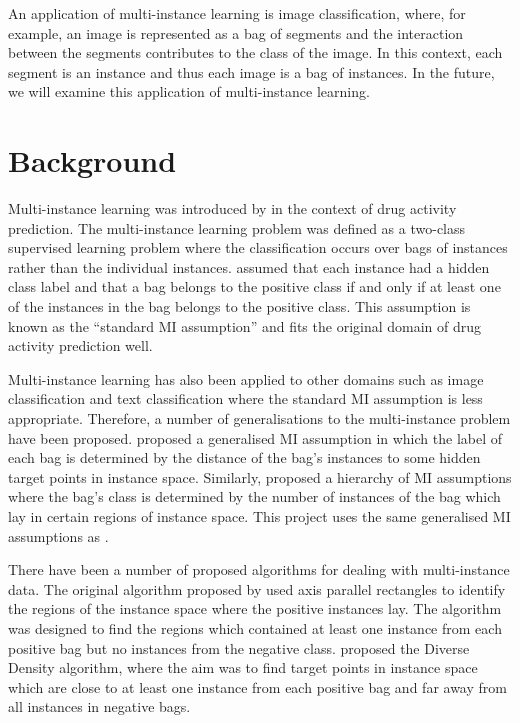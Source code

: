 \documentclass[a4paper,12pt]{article} %
\begin{document}
An application of multi-instance learning is image classification,
    where, for example, 
    an image is represented as a bag of segments and 
    the interaction between the segments contributes 
    to the class of the image. 
In this context, 
    each segment is an instance and 
    thus each image is a bag of instances. 
In the future, we will examine this application of multi-instance learning.

\section{Background}

Multi-instance learning was introduced by  
    in the context of drug activity prediction. 
The multi-instance learning problem was 
    defined as a two-class supervised learning problem where 
    the classification occurs over bags of instances 
    rather than the individual instances. 
 assumed that each instance had a hidden class label and 
    that a bag belongs to the positive class if and only if 
    at least one of the instances in the bag belongs to the positive class. 
This assumption is known as the ``standard MI assumption'' and 
    fits the original domain of drug activity prediction well.

Multi-instance learning has also been applied to other domains 
    such as image classification and text classification where 
    the standard MI assumption is less appropriate. 
Therefore, a number of generalisations to the multi-instance problem have been proposed.
 proposed a generalised MI assumption in which 
    the label of each bag is determined by the 
    distance of the bag's instances to some hidden target points in instance space.
Similarly,  proposed a hierarchy of MI assumptions where 
    the bag's class is determined by the number of instances 
    of the bag which lay in certain regions of instance space.
This project uses the same generalised MI assumptions as .

There have been a number of proposed algorithms 
    for dealing with multi-instance data. 
The original algorithm proposed by  
    used axis parallel rectangles to identify the regions of the instance space 
    where the positive instances lay. 
The algorithm was designed to find the regions which 
    contained at least one instance from each positive bag 
    but no instances from the negative class. 
 proposed the Diverse Density algorithm, 
    where the aim was to find target points in instance space 
    which are close to at least one instance from each positive bag and 
    far away from all instances in negative bags.
\end{document}
